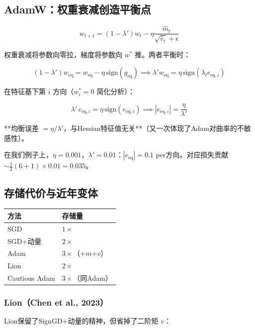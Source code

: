 \documentclass[12pt,a4paper]{article}
\begin{document}
\subsection{AdamW：权重衰减创造平衡点}


\[w_{t+1} = (1-\lambda')w_t - \eta \frac{\hat{m}_t}{\sqrt{\hat{v}_t}+\epsilon}\]

权重衰减将参数向零拉，梯度将参数向 $w^*$ 推。两者平衡时：


\[(1-\lambda')w_{\text{eq}} = w_{\text{eq}} - \eta\,\text{sign}(g_{\text{eq}}) \implies \lambda' w_{\text{eq}} = \eta\,\text{sign}(\lambda_i e_{\text{eq},i})\]

在特征基下第 $i$ 方向（$w^*_i = 0$ 简化分析）：


\[\lambda'\,e_{\text{eq},i} = \eta\,\text{sign}(e_{\text{eq},i}) \implies |e_{\text{eq},i}| = \frac{\eta}{\lambda'}\]

**均衡误差 $= \eta/\lambda'$，与Hessian特征值无关**（又一次体现了Adam对曲率的不敏感性）。

在我们例子上，$\eta = 0.001$，$\lambda' = 0.01$：$|e_{\text{eq}}| = 0.1$ per方向。对应损失贡献 $\sim \frac{1}{2}(6 + 1) \times 0.01 = 0.035$。


\subsection{存储代价与近年变体}








\begin{center}\small
\begin{longtable}{|l|l|}
\hline
方法 & 存储量 \\
\hline
SGD & $1\times$ \\
SGD+动量 & $2\times$ \\
Adam & $3\times$（+$m$+$v$） \\
Lion & $2\times$ \\
Cautious Adam & $3\times$（同Adam） \\
\hline
\end{longtable}
\end{center}



\subsubsection{Lion（Chen et al., 2023）}

Lion保留了SignGD+动量的精神，但省掉了二阶矩 $v$：
\end{document}
